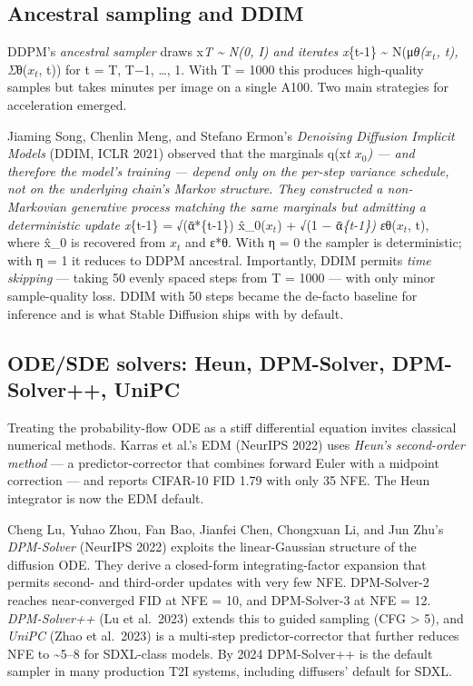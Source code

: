 \subsection{Ancestral sampling and DDIM}\label{ancestral-sampling-and-ddim}

DDPM's \emph{ancestral sampler} draws x\emph{T \textasciitilde{} N(0, I) and iterates x}\{t-1\} \textasciitilde{} N(μ\emph{θ(\(x_t\), t), Σ}θ(\(x_t\), t)) for t = T, T−1, \ldots, 1. With T = 1000 this produces high-quality samples but takes minutes per image on a single A100. Two main strategies for acceleration emerged.

Jiaming Song, Chenlin Meng, and Stefano Ermon's \emph{Denoising Diffusion Implicit Models} (DDIM, ICLR 2021) observed that the marginals q(x\emph{t \textbar{} \(x_0\)) --- and therefore the model's training --- depend only on the per-step variance schedule, not on the underlying chain's Markov structure. They constructed a non-Markovian generative process matching the same marginals but admitting a deterministic update x}\{t-1\} = √(ᾱ*\{t-1\}) x̂\_0(\(x_t\)) + √(1 − ᾱ\emph{\{t-1\}) ε}θ(\(x_t\), t), where x̂\_0 is recovered from \(x_t\) and ε*θ. With η = 0 the sampler is deterministic; with η = 1 it reduces to DDPM ancestral. Importantly, DDIM permits \emph{time skipping} --- taking 50 evenly spaced steps from T = 1000 --- with only minor sample-quality loss. DDIM with 50 steps became the de-facto baseline for inference and is what Stable Diffusion ships with by default.

\subsection{ODE/SDE solvers: Heun, DPM-Solver, DPM-Solver++, UniPC}\label{odesde-solvers-heun-dpm-solver-dpm-solver-unipc}

Treating the probability-flow ODE as a stiff differential equation invites classical numerical methods. Karras et al.'s EDM (NeurIPS 2022) uses \emph{Heun's second-order method} --- a predictor-corrector that combines forward Euler with a midpoint correction --- and reports CIFAR-10 FID 1.79 with only 35 NFE. The Heun integrator is now the EDM default.

Cheng Lu, Yuhao Zhou, Fan Bao, Jianfei Chen, Chongxuan Li, and Jun Zhu's \emph{DPM-Solver} (NeurIPS 2022) exploits the linear-Gaussian structure of the diffusion ODE. They derive a closed-form integrating-factor expansion that permits second- and third-order updates with very few NFE. DPM-Solver-2 reaches near-converged FID at NFE = 10, and DPM-Solver-3 at NFE = 12. \emph{DPM-Solver++} (Lu et al.~2023) extends this to guided sampling (CFG \textgreater{} 5), and \emph{UniPC} (Zhao et al.~2023) is a multi-step predictor-corrector that further reduces NFE to \textasciitilde5--8 for SDXL-class models. By 2024 DPM-Solver++ is the default sampler in many production T2I systems, including diffusers' default for SDXL.

